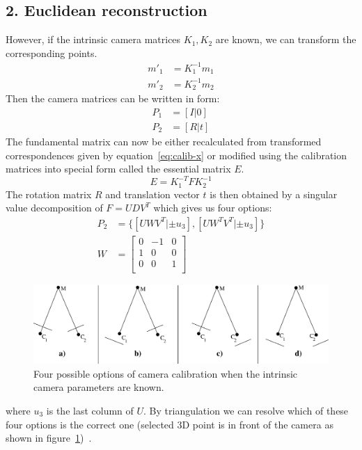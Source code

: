 \subsection*{2. Euclidean reconstruction}
However, if the intrinsic camera matrices $K_1, K_2$ are known, we can transform the corresponding points.
\begin{equation}
  \begin{aligned}
	m'_1 &= K_1^{-1} m_1 \\
	m'_2 &= K_2^{-1} m_2
  \end{aligned}
	\label{eq:calib-x}
\end{equation}
Then the camera matrices can be written in form:
\begin{equation}
  \begin{aligned}
	P_1 &= [I|0] \\
	P_2 &= [R|t] 
  \end{aligned}
\end{equation}
The fundamental matrix can now be either recalculated from transformed correspondences given by equation~\ref{eq:calib-x} or modified using the calibration matrices into special form called the essential matrix $E$.
\begin{equation}
	E = K_1^{-T} F K_2^{-1}
\end{equation}
The rotation matrix $R$ and translation vector $t$ is then obtained by a singular value decomposition of $F = UDV^T$ which gives us four options:
\begin{equation}
  \begin{aligned}
	P_2 &= \{[UWV^T | \pm u_3], [UW^T V^T | \pm u_3]\} \\
	W &= 
	\begin{bmatrix}
		0 & -1 & 0 \\	
		1 & 0 & 0 \\	
		0 & 0 & 1 \\	
	\end{bmatrix}
  \end{aligned}
\end{equation}
\begin{figure}[!htbp]
	\begin{center}
		\includegraphics[keepaspectratio,width=\textwidth]{fig/calibration-options.pdf}
	\end{center}
	\caption{Four possible options of camera calibration when the intrinsic camera parameters are known.}
	\label{fig:caliboptions}
\end{figure}
where $u_3$ is the last column of $U$. By triangulation we can resolve which of these four options is the correct one (selected 3D point is in front of the camera as shown in figure~\ref{fig:caliboptions})~\cite{cvfx, elements-of-computer-vision, book:multiple_view_geometry}.

